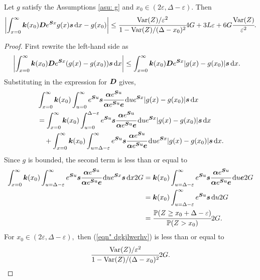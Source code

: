  \begin{lem} \label{lem:tttttt}
 	Let \(g\) satisfy the Assumptions \ref{asu: g} and \(x_0\in(2\varepsilon,\Delta-\varepsilon)\). Then
 	\begin{align}
 		\left|\int_{x=0}^\infty \boldsymbol k(x_0)\boldsymbol De^{\boldsymbol Sx}g(x)\boldsymbol s\, \mathrm{d} x - g(x_0)\right| \leq \cfrac{\mathrm{Var}(Z)/\varepsilon^2}{1-\mathrm{Var}(Z)/(\Delta-x_0)^2}4G + 3L\varepsilon+6G\cfrac{\mathrm{Var}(Z)}{\varepsilon^2}.
 	\end{align}
 \end{lem}
 \begin{proof}
 	First rewrite the left-hand side as 
 	\begin{align}
 		\left|\int_{x=0}^\infty \boldsymbol k(x_0)\boldsymbol De^{\boldsymbol Sx}(g(x)-g(x_0))\boldsymbol s\, \mathrm{d} x \right|
 		&\leq \int_{x=0}^\infty \boldsymbol k(x_0)\boldsymbol De^{\boldsymbol Sx}|g(x)-g(x_0)|\boldsymbol s\, \mathrm{d} x.
 	\end{align}
 	Substituting in the expression for \(\boldsymbol D\) gives,
 	\begin{align}
 		&\int_{x=0}^\infty \boldsymbol k(x_0)\int_{u=0}^\infty e^{\boldsymbol Su}\boldsymbol s \cfrac{\boldsymbol \alpha e^{\boldsymbol Su}}{\boldsymbol \alpha e^{\boldsymbol Su}\boldsymbol e} \, \mathrm{d} u e^{\boldsymbol Sx}|g(x)-g(x_0)|\boldsymbol s\, \mathrm{d} x  \nonumber 
 		\\&= \int_{x=0}^\infty \boldsymbol k(x_0)\int_{u=0}^{\Delta-\varepsilon} e^{\boldsymbol Su}\boldsymbol s \cfrac{\boldsymbol \alpha e^{\boldsymbol Su}}{\boldsymbol \alpha e^{\boldsymbol Su}\boldsymbol e} \, \mathrm{d} u e^{\boldsymbol Sx}|g(x)-g(x_0)|\boldsymbol s\, \mathrm{d} x \nonumber
 		\\&\quad {} + \int_{x=0}^\infty \boldsymbol k(x_0)\int_{u=\Delta-\varepsilon}^\infty e^{\boldsymbol Su}\boldsymbol s \cfrac{\boldsymbol \alpha e^{\boldsymbol Su}}{\boldsymbol \alpha e^{\boldsymbol Su}\boldsymbol e} \, \mathrm{d} u e^{\boldsymbol Sx}|g(x)-g(x_0)|\boldsymbol s\, \mathrm{d} x. \label{eqn: 2nd here}
 	\end{align}
 	Since \(g\) is bounded, the second term is less than or equal to 
 	\begin{align}
 		\int_{x=0}^\infty \boldsymbol k(x_0)\int_{u=\Delta-\varepsilon}^\infty e^{\boldsymbol Su}\boldsymbol s \cfrac{\boldsymbol \alpha e^{\boldsymbol Su}}{\boldsymbol \alpha e^{\boldsymbol Su}\boldsymbol e} \, \mathrm{d} u e^{\boldsymbol Sx}\boldsymbol s\, \mathrm{d} x 2G \nonumber
 		&= \boldsymbol k(x_0)\int_{u=\Delta-\varepsilon}^\infty e^{\boldsymbol Su}\boldsymbol s \cfrac{\boldsymbol \alpha e^{\boldsymbol Su}}{\boldsymbol \alpha e^{\boldsymbol Su}\boldsymbol e} \, \mathrm{d} u \boldsymbol e 2G \nonumber
 		\\&= \boldsymbol k(x_0)\int_{u=\Delta-\varepsilon}^\infty e^{\boldsymbol Su}\boldsymbol s \, \mathrm{d} u2G \nonumber
 		\\&= \cfrac{\mathbb P(Z\geq x_0+\Delta-\varepsilon)}{\mathbb P(Z>x_0)}2G. \label{eqn" dgkjlwerhv}
 	\end{align}
 	For \(x_0\in(2\varepsilon,\Delta-\varepsilon),\) then (\ref{eqn" dgkjlwerhv}) is less than or equal to 
 	\[\cfrac{\mathrm{Var}(Z)/\varepsilon^2}{1-\mathrm{Var}(Z)/(\Delta-x_0)^2}2G.\]
	

\end{proof}
